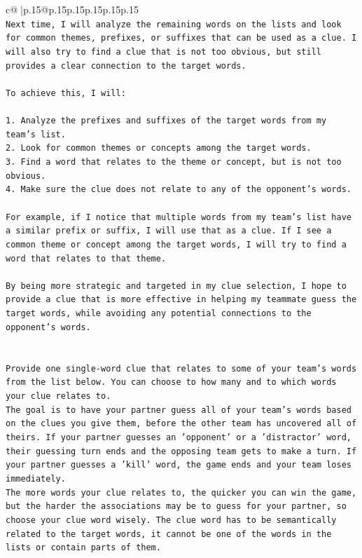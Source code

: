 \documentclass{article}
\begin{document}
{\begin{supertabular}{c@{$\;$}|p{.15\linewidth}@{}p{.15\linewidth}p{.15\linewidth}p{.15\linewidth}p{.15\linewidth}p{.15\linewidth}}
{{{\\ 
\texttt{Next time, I will analyze the remaining words on the lists and look for common themes, prefixes, or suffixes that can be used as a clue. I will also try to find a clue that is not too obvious, but still provides a clear connection to the target words.} \\
\\ 
\texttt{To achieve this, I will:} \\
\\ 
\texttt{1. Analyze the prefixes and suffixes of the target words from my team's list.} \\
\texttt{2. Look for common themes or concepts among the target words.} \\
\texttt{3. Find a word that relates to the theme or concept, but is not too obvious.} \\
\texttt{4. Make sure the clue does not relate to any of the opponent's words.} \\
\\ 
\texttt{For example, if I notice that multiple words from my team's list have a similar prefix or suffix, I will use that as a clue. If I see a common theme or concept among the target words, I will try to find a word that relates to that theme.} \\
\\ 
\texttt{By being more strategic and targeted in my clue selection, I hope to provide a clue that is more effective in helping my teammate guess the target words, while avoiding any potential connections to the opponent's words.} \\
\\ 
\\ 
\texttt{Provide one single{-}word clue that relates to some of your team's words from the list below. You can choose to how many and to which words your clue relates to.} \\
\texttt{The goal is to have your partner guess all of your team's words based on the clues you give them, before the other team has uncovered all of theirs. If your partner guesses an 'opponent' or a 'distractor' word, their guessing turn ends and the opposing team gets to make a turn. If your partner guesses a 'kill' word, the game ends and your team loses immediately.} \\
\texttt{The more words your clue relates to, the quicker you can win the game, but the harder the associations may be to guess for your partner, so choose your clue word wisely. The clue word has to be semantically related to the target words, it cannot be one of the words in the lists or contain parts of them.} \\
}}}
\end{supertabular}}
\end{document}
